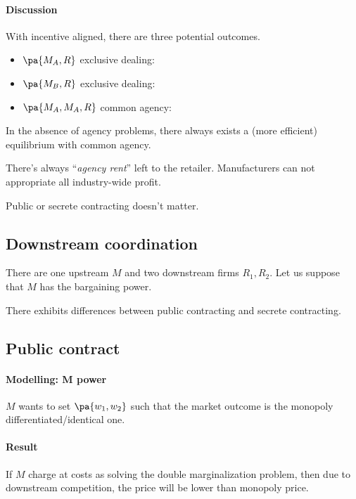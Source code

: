\paragraph{Discussion} \label{upstr_coor:discussion} With incentive aligned, there are three potential outcomes.
\begin{itemize}
    \item $\pa{M_A, R}$ exclusive dealing:
    \item $\pa{M_B, R}$ exclusive dealing:
    \item $\pa{M_A, M_A, R}$ common agency: 
\end{itemize}
\begin{remark}
    In the absence of agency problems, there always exists a (more efficient) equilibrium with common agency.
\end{remark}
\begin{remark}
    There's always ``\textit{agency rent}'' left to the retailer. Manufacturers can not appropriate all industry-wide profit.
\end{remark}
\begin{remark}
    Public or secrete contracting doesn't matter.
\end{remark}

\subsection{Downstream coordination}
There are one upstream $M$ and two downstream firms $R_1,R_2$. Let us suppose that $M$ has the bargaining power. 
\begin{remark}
    There exhibits differences between public contracting and secrete contracting.
\end{remark}
\subsection*{Public contract}
\paragraph{Modelling: M power}
$M$ wants to set $\pa{w_1,w_2}$ such that the market outcome is the monopoly differentiated/identical one.
\paragraph{Result} If $M$ charge at costs as solving the double marginalization problem, then due to downstream competition, the price will be lower than monopoly price.
